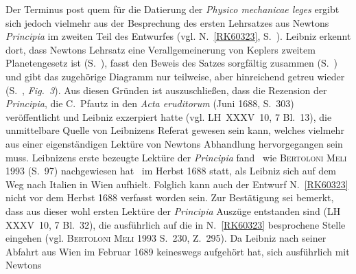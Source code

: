 \begin{ledgroup}
Der Terminus post quem für die Datierung der \textit{Physico mechanicae leges} ergibt sich jedoch vielmehr aus der Besprechung des ersten Lehrsatzes aus Newtons%
\protect{}
\textit{Principia}\cite{00535} im zweiten Teil des Entwurfes (vgl. N.~\ref{RK60323}, S.~).
Leibniz erkennt dort, dass Newtons\protect{}
Lehrsatz eine Verallgemeinerung von Keplers\protect{}
zweitem Planetengesetz ist (S.~), fasst den Beweis des Satzes sorgfältig zusammen (S.~) und gibt das zugehörige Diagramm nur teilweise, aber hinreichend getreu wieder (S.~\pageref{LH_37_05_105v_Fig.3}, \lbrack\textit{Fig.~3}\rbrack).
Aus diesen Gründen ist auszuschließen, dass die Rezension\cite{01356} der \textit{Principia},\cite{00535} die C.~Pfautz\protect{}
in den \textit{Acta eruditorum} (Juni 1688, S.~303) veröffentlicht und Leibniz exzerpiert hatte (vgl. LH~XXXV~10, 7 Bl.~13), die unmittelbare Quelle von Leibnizens Referat gewesen sein kann, welches vielmehr aus einer eigenständigen Lektüre von Newtons\protect{}
Abhandlung hervorgegangen sein muss.
Leibnizens erste bezeugte Lektüre der \textit{Principia}\cite{00535} fand \textendash\ wie \textsc{Bertoloni Meli} 1993 (S.~97)\cite{01357}
nachgewiesen hat \textendash\ im Herbst 1688 statt, als Leibniz sich auf dem Weg nach Italien in Wien aufhielt.
Folglich kann auch der Entwurf N.~\ref{RK60323} nicht vor dem Herbst 1688 verfasst worden sein.
Zur Bestätigung sei bemerkt, dass aus dieser wohl ersten Lektüre der \textit{Principia}\cite{00535} Auszüge entstanden sind (LH XXXV~10, 7 Bl.~32), die ausführlich auf die in N.~\ref{RK60323} besprochene Stelle eingehen (vgl. \textsc{Bertoloni Meli} 1993 S.~230, Z.~295\cite{01357}).%
\pend%
%
\pstart%
Da Leibniz nach seiner Abfahrt aus Wien im Februar 1689 keineswegs aufgehört hat, sich ausführlich mit Newtons%

\end{ledgroup}

